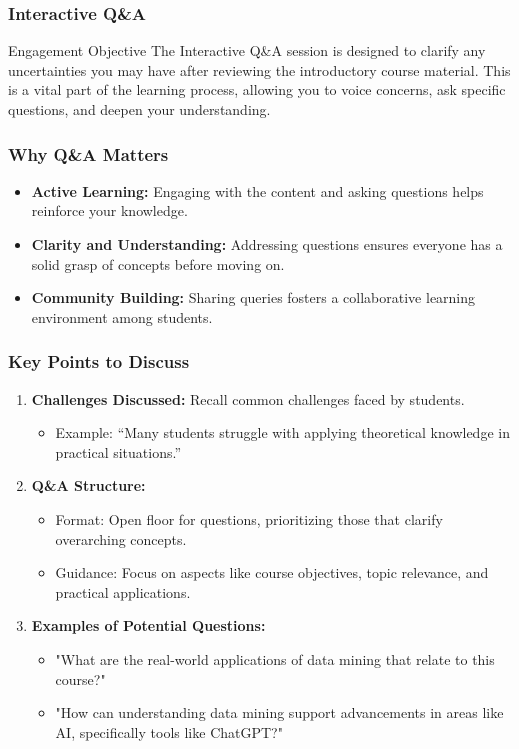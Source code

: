 \documentclass[aspectratio=169]{beamer}
\begin{document}
\begin{frame}[fragile]
    \frametitle{Interactive Q\&A}
    \begin{block}{Engagement Objective}
        The Interactive Q\&A session is designed to clarify any uncertainties you may have after reviewing the introductory course material. 
        This is a vital part of the learning process, allowing you to voice concerns, ask specific questions, and deepen your understanding.
    \end{block}
\end{frame}

\begin{frame}[fragile]
    \frametitle{Why Q\&A Matters}
    \begin{itemize}
        \item \textbf{Active Learning:} Engaging with the content and asking questions helps reinforce your knowledge.
        \item \textbf{Clarity and Understanding:} Addressing questions ensures everyone has a solid grasp of concepts before moving on.
        \item \textbf{Community Building:} Sharing queries fosters a collaborative learning environment among students.
    \end{itemize}
\end{frame}

\begin{frame}[fragile]
    \frametitle{Key Points to Discuss}
    \begin{enumerate}
        \item \textbf{Challenges Discussed:} Recall common challenges faced by students. 
              \begin{itemize}
                  \item Example: “Many students struggle with applying theoretical knowledge in practical situations.”
              \end{itemize}
        \item \textbf{Q\&A Structure:}
              \begin{itemize}
                  \item Format: Open floor for questions, prioritizing those that clarify overarching concepts.
                  \item Guidance: Focus on aspects like course objectives, topic relevance, and practical applications.
              \end{itemize}
        \item \textbf{Examples of Potential Questions:}
              \begin{itemize}
                  \item "What are the real-world applications of data mining that relate to this course?"
                  \item "How can understanding data mining support advancements in areas like AI, specifically tools like ChatGPT?"
              \end{itemize}
    \end{enumerate}
\end{frame}
\end{document}
